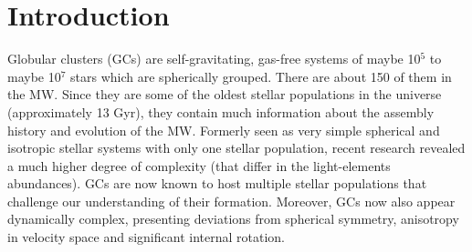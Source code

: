 

\section{Introduction}\label{Introduction}
Globular clusters (\acsp{GC}) are self-gravitating, gas-free systems of maybe 10\(^5\) to maybe 10\(^7\) stars which are spherically grouped. There are about 150 of them in the \ac{MW}. Since they are some of the oldest stellar populations in the universe (approximately 13 Gyr), they contain much information about the assembly history and evolution of the \ac{MW}. Formerly seen as very simple spherical and isotropic stellar systems with only one stellar population, recent research revealed a much higher degree of complexity (that differ in the light-elements abundances). \acp{GC} are now known to host multiple stellar populations that challenge our understanding of their formation. Moreover, \acp{GC} now also appear dynamically complex, presenting deviations from spherical symmetry, anisotropy in velocity space and significant internal rotation.
 
